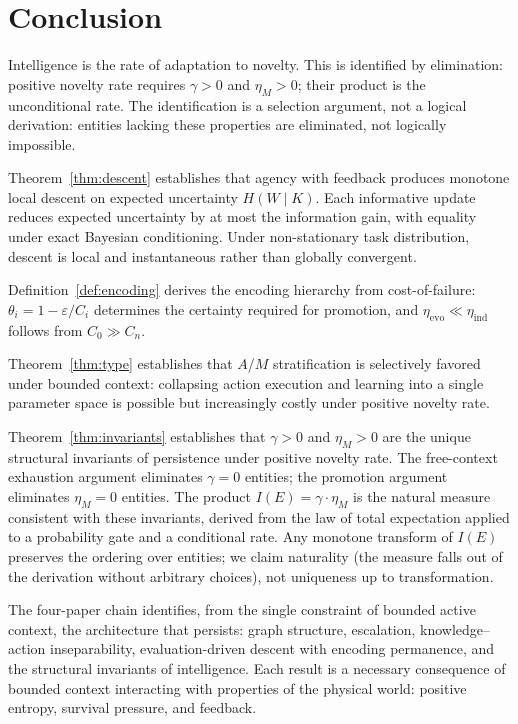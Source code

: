 \documentclass[11pt]{article}
\theoremstyle{definition}
\theoremstyle{remark}
\begin{document}
\section{Conclusion}
\label{sec:conclusion}

Intelligence is the rate of adaptation to novelty. This is identified by elimination: positive novelty rate requires $\gamma > 0$
and $\eta_M > 0$; their product is the unconditional rate. The identification is a selection argument, not a logical derivation: entities lacking these properties are eliminated, not logically impossible.

Theorem~\ref{thm:descent} establishes that agency with feedback
produces monotone local descent on expected uncertainty $H(W \mid K)$.
Each informative update reduces expected uncertainty by at most the
information gain, with equality under exact Bayesian conditioning. Under
non-stationary task distribution, descent is local and instantaneous
rather than globally convergent.

Definition~\ref{def:encoding} derives the encoding hierarchy from
cost-of-failure: $\theta_i = 1 - \varepsilon / C_i$ determines the
certainty required for promotion, and $\eta_{\mathrm{evo}} \ll
\eta_{\mathrm{ind}}$ follows from $C_0 \gg C_n$.

Theorem~\ref{thm:type} establishes that $A$/$M$ stratification is
selectively favored under bounded context: collapsing action execution
and learning into a single parameter space is possible but increasingly
costly under positive novelty rate.

Theorem~\ref{thm:invariants} establishes that $\gamma > 0$ and
$\eta_M > 0$ are the unique structural invariants of persistence under
positive novelty rate. The free-context exhaustion argument eliminates
$\gamma = 0$ entities; the promotion argument eliminates $\eta_M = 0$
entities. The product $I(E) = \gamma \cdot \eta_M$ is the natural measure
consistent with these invariants, derived from the law of total
expectation applied to a probability gate and a conditional rate.
Any monotone transform of $I(E)$ preserves the ordering over entities;
we claim naturality (the measure falls out of the derivation without
arbitrary choices), not uniqueness up to transformation.

The four-paper chain identifies, from the single constraint of bounded
active context, the architecture that persists: graph structure,
escalation, knowledge--action inseparability, evaluation-driven descent
with encoding permanence, and the structural invariants of intelligence.
Each result is a necessary consequence of bounded context interacting
with properties of the physical world: positive entropy, survival
pressure, and feedback.
\end{document}
